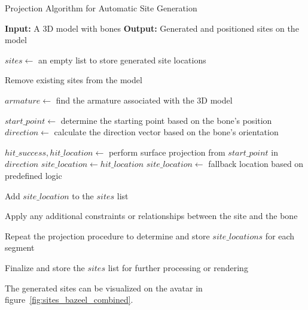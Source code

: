 \documentclass[../../main.tex]{subfiles}
\begin{document}
\begin{algorithm}[ht]
    \caption{Projection Algorithm for Automatic Site Generation}
    \label{alg:site_generation_with_projection}
    \begin{algorithmic}
        \State \textbf{Input:} A 3D model with bones
        \State \textbf{Output:} Generated and positioned sites on the model

        \State $sites \gets$ an empty list to store generated site locations

        \State Remove existing sites from the model

        \State $armature \gets$ find the armature associated with the 3D model

            \State $start\_point \gets$ determine the starting point based on the bone's position
            \State $direction \gets$ calculate the direction vector based on the bone's orientation
            
            \State $hit\_success, hit\_location \gets$ perform surface projection from $start\_point$ in $direction$
                \State $site\_location \gets hit\_location$
            \Else
                \State $site\_location \gets$ fallback location based on predefined logic
            \EndIf

            \State Add $site\_location$ to the $sites$ list
            
            \State Apply any additional constraints or relationships between the site and the bone
        \EndFor

                \State Repeat the projection procedure to determine and store $site\_locations$ for each segment
            \EndFor
        \EndFor

        \State Finalize and store the $sites$ list for further processing or rendering
    \end{algorithmic}
\end{algorithm}

The generated sites can be visualized on the avatar in figure~\ref{fig:sites_bazeel_combined}.
\end{document}
